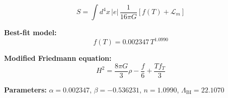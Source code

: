 
\begin{equation}
  S = \int d^4x \, |e| \, \frac{1}{16\pi G} \left[ f(T) + \mathcal{L}_m \right]
\end{equation}

\textbf{Best-fit model:}
\begin{equation}
  f(T) = 0.002347 \, T^{1.0990}
\end{equation}

\textbf{Modified Friedmann equation:}
\begin{equation}
  H^2 = \frac{8\pi G}{3} \rho - \frac{f}{6} + \frac{T f_T}{3}
\end{equation}

\textbf{Parameters:}
$\alpha = 0.002347$, \quad
$\beta = -0.536231$, \quad
$n = 1.0990$, \quad
$\Lambda_{\text{BI}} = 22.1070$